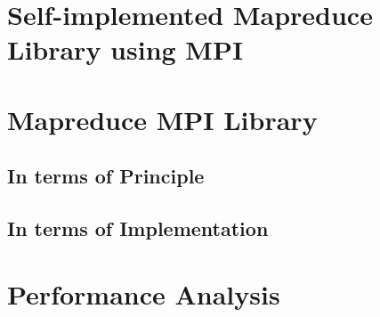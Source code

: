 \documentclass{article}
\begin{document}
    \clearpage
    \section{Self-implemented Mapreduce Library using MPI}

    
    \clearpage
    
    \section{Mapreduce MPI Library}
    
    \subsection{In terms of Principle}
    \clearpage
    
    \subsection{In terms of Implementation}    
    \clearpage
    
    \section{Performance Analysis}
    
    
\end{document}

